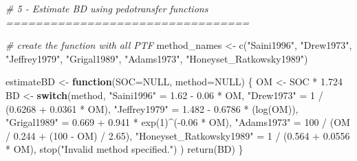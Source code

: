 \documentclass[
  10pt,
  b5paper,
  oneside]{book}
\newenvironment{Shaded}{\begin{snugshade}}{\end{snugshade}}
\newcommand{\AttributeTok}[1]{\textcolor[rgb]{0.77,0.63,0.00}{#1}}
\newcommand{\CommentTok}[1]{\textcolor[rgb]{0.56,0.35,0.01}{\textit{#1}}}
\newcommand{\ConstantTok}[1]{\textcolor[rgb]{0.00,0.00,0.00}{#1}}
\newcommand{\ControlFlowTok}[1]{\textcolor[rgb]{0.13,0.29,0.53}{\textbf{#1}}}
\newcommand{\DecValTok}[1]{\textcolor[rgb]{0.00,0.00,0.81}{#1}}
\newcommand{\FloatTok}[1]{\textcolor[rgb]{0.00,0.00,0.81}{#1}}
\newcommand{\FunctionTok}[1]{\textcolor[rgb]{0.00,0.00,0.00}{#1}}
\newcommand{\NormalTok}[1]{#1}
\newcommand{\OtherTok}[1]{\textcolor[rgb]{0.56,0.35,0.01}{#1}}
\newcommand{\SpecialCharTok}[1]{\textcolor[rgb]{0.00,0.00,0.00}{#1}}
\newcommand{\StringTok}[1]{\textcolor[rgb]{0.31,0.60,0.02}{#1}}
\begin{document}
\begin{Shaded}
\begin{Highlighting}[]
\CommentTok{\# 5 {-} Estimate BD using pedotransfer functions =================================}

\CommentTok{\# create the function with all PTF}
\NormalTok{method\_names }\OtherTok{\textless{}{-}} \FunctionTok{c}\NormalTok{(}\StringTok{"Saini1996"}\NormalTok{, }\StringTok{"Drew1973"}\NormalTok{, }\StringTok{"Jeffrey1979"}\NormalTok{, }\StringTok{"Grigal1989"}\NormalTok{, }
                  \StringTok{"Adams1973"}\NormalTok{, }\StringTok{"Honeyset\_Ratkowsky1989"}\NormalTok{) }

\NormalTok{estimateBD }\OtherTok{\textless{}{-}} \ControlFlowTok{function}\NormalTok{(}\AttributeTok{SOC=}\ConstantTok{NULL}\NormalTok{, }\AttributeTok{method=}\ConstantTok{NULL}\NormalTok{) \{}
\NormalTok{  OM }\OtherTok{\textless{}{-}}\NormalTok{ SOC }\SpecialCharTok{*} \FloatTok{1.724}
\NormalTok{  BD }\OtherTok{\textless{}{-}} \ControlFlowTok{switch}\NormalTok{(method,}
               \StringTok{"Saini1996"} \OtherTok{=} \FloatTok{1.62} \SpecialCharTok{{-}} \FloatTok{0.06} \SpecialCharTok{*}\NormalTok{ OM,}
               \StringTok{"Drew1973"} \OtherTok{=} \DecValTok{1} \SpecialCharTok{/}\NormalTok{ (}\FloatTok{0.6268} \SpecialCharTok{+} \FloatTok{0.0361} \SpecialCharTok{*}\NormalTok{ OM),}
               \StringTok{"Jeffrey1979"} \OtherTok{=} \FloatTok{1.482} \SpecialCharTok{{-}} \FloatTok{0.6786} \SpecialCharTok{*}\NormalTok{ (}\FunctionTok{log}\NormalTok{(OM)),}
               \StringTok{"Grigal1989"} \OtherTok{=} \FloatTok{0.669} \SpecialCharTok{+} \FloatTok{0.941} \SpecialCharTok{*} \FunctionTok{exp}\NormalTok{(}\DecValTok{1}\NormalTok{)}\SpecialCharTok{\^{}}\NormalTok{(}\SpecialCharTok{{-}}\FloatTok{0.06} \SpecialCharTok{*}\NormalTok{ OM),}
               \StringTok{"Adams1973"} \OtherTok{=} \DecValTok{100} \SpecialCharTok{/}\NormalTok{ (OM }\SpecialCharTok{/} \FloatTok{0.244} \SpecialCharTok{+}\NormalTok{ (}\DecValTok{100} \SpecialCharTok{{-}}\NormalTok{ OM) }\SpecialCharTok{/} \FloatTok{2.65}\NormalTok{),}
               \StringTok{"Honeyset\_Ratkowsky1989"} \OtherTok{=} \DecValTok{1} \SpecialCharTok{/}\NormalTok{ (}\FloatTok{0.564} \SpecialCharTok{+} \FloatTok{0.0556} \SpecialCharTok{*}\NormalTok{ OM),}
               \FunctionTok{stop}\NormalTok{(}\StringTok{"Invalid method specified."}\NormalTok{)}
\NormalTok{  )}
  \FunctionTok{return}\NormalTok{(BD)}
\NormalTok{\}}
\end{Highlighting}
\end{Shaded}
\end{document}
